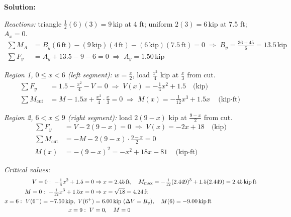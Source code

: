 \documentclass[11pt]{article}
\newcommand{\un}[1]{\,\text{#1}}
\begin{document}
\textbf{Solution:}

\textit{Reactions:} triangle $\tfrac12(6)(3) = 9\un{kip}$ at 4 ft; uniform $2(3) = 6\un{kip}$ at 7.5 ft; $A_x = 0$.
\begin{align*}
\textstyle\sum M_A &= B_y(6\un{ft}) - (9\un{kip})(4\un{ft}) - (6\un{kip})(7.5\un{ft}) = 0 \;\Rightarrow\; B_y = \frac{36 + 45}{6} = 13.5\un{kip}\\
\textstyle\sum F_y &= A_y + 13.5 - 9 - 6 = 0 \;\Rightarrow\; A_y = 1.50\un{kip}
\end{align*}

\textit{Region 1, $0 \le x < 6$ (left segment):} $w = \tfrac{x}{2}$, load $\tfrac{x^2}{4}$ kip at $\tfrac{x}{3}$ from cut.
\begin{align*}
\textstyle\sum F_y &= 1.5 - \frac{x^2}{4} - V = 0 \;\Rightarrow\; V(x) = -\frac14 x^2 + 1.5 \quad \text{(kip)}\\
\textstyle\sum M_{\text{cut}} &= M - 1.5x + \frac{x^2}{4}\cdot\frac{x}{3} = 0 \;\Rightarrow\; M(x) = -\frac{1}{12}x^3 + 1.5x \quad \text{(kip$\cdot$ft)}
\end{align*}

\textit{Region 2, $6 < x \le 9$ (right segment):} load $2(9-x)$ kip at $\tfrac{9-x}{2}$ from cut.
\begin{align*}
\textstyle\sum F_y &= V - 2(9-x) = 0 \;\Rightarrow\; V(x) = -2x + 18 \quad \text{(kip)}\\
\textstyle\sum M_{\text{cut}} &= -M - 2(9-x)\cdot\frac{9-x}{2} = 0\\ M(x) &= -(9-x)^2 = -x^2 + 18x - 81 \quad \text{(kip$\cdot$ft)}
\end{align*}

\textit{Critical values:}
\begin{align*}
V = 0:\ -\tfrac14x^2 + 1.5 = 0 &\Rightarrow x = 2.45\un{ft},\quad M_{\max} = -\tfrac1{12}(2.449)^3 + 1.5(2.449) = 2.45\un{kip\,ft}\\
M = 0:\ -\tfrac1{12}x^3 + 1.5x = 0 &\Rightarrow x = \sqrt{18} = 4.24\un{ft}\\
x = 6:\ V(6^-) = -7.50\un{kip},\ V(6^+) &= 6.00\un{kip}\ (\Delta V = B_y),\quad M(6) = -9.00\un{kip\,ft}\\
x = 9:\ V &= 0,\quad M = 0
\end{align*}
\end{document}

